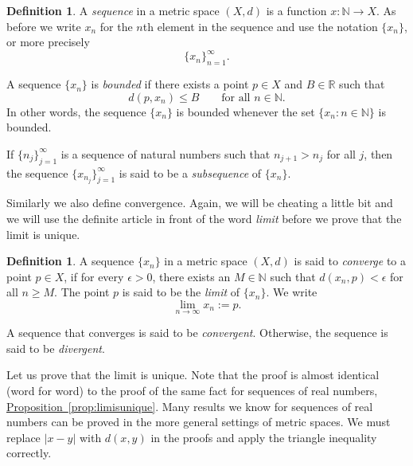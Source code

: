 \documentclass[12pt]{book}
\newcommand{\abs}[1]{\left\lvert {#1} \right\rvert}
\newcommand{\R}{{\mathbb{R}}}
\newcommand{\N}{{\mathbb{N}}}
\newcommand{\myindex}[1]{#1\index{#1}}
\theoremstyle{plain}
\theoremstyle{remark}
\theoremstyle{definition}
\newtheorem{defn}[thm]{Definition}
\theoremstyle{exercise}
\theoremstyle{example}
\newcommand{\propref}[1]{\hyperref[#1]{Proposition~\ref*{#1}}}
\begin{document}
\begin{defn}
A \emph{\myindex{sequence}} in a metric space $(X,d)$ is a function
$x \colon \N \to X$.  As before we write $x_n$ for the $n$th element in
the sequence and use the notation $\{ x_n \}$, or more precisely
\begin{equation*}
\{ x_n \}_{n=1}^\infty .
\end{equation*}

A sequence $\{ x_n \}$ is \emph{bounded} if
there exists a point $p \in X$ and $B \in \R$ such that
\begin{equation*}
d(p,x_n) \leq B \qquad \text{for all $n \in \N$.}
\end{equation*}
In other words, the sequence $\{x_n\}$ is bounded whenever
the set $\{ x_n : n \in \N \}$
is bounded.

If $\{ n_j \}_{j=1}^\infty$ is a sequence of natural numbers
such that $n_{j+1} > n_j$ for all $j$, then
the sequence $\{ x_{n_j} \}_{j=1}^\infty$ is said to be
a \emph{\myindex{subsequence}} of $\{x_n \}$.
\end{defn}

Similarly we also define convergence.  Again, we will be cheating a little
bit and we will use the definite article in front of the word \emph{limit}
before we prove that the limit is unique.

\begin{defn}
A sequence $\{ x_n \}$ in a metric space $(X,d)$ is said
to \emph{\myindex{converge}} to a point
$p \in X$, if for every $\epsilon > 0$, there exists an $M \in \N$ such
that $d(x_n,p) < \epsilon$ for all $n \geq M$.  The point $p$
is said to be the \emph{limit}
of $\{ x_n \}$.  We write
\begin{equation*}
\lim_{n\to \infty} x_n := p .
\end{equation*}

A sequence
that converges is said to be \emph{convergent}.
Otherwise, the sequence is said to be
\emph{divergent}.
\end{defn}

Let us prove that the limit is unique.  Note that the proof is almost
identical (word for word) to the proof of the same fact for sequences of
real numbers,
\propref{prop:limisunique}.
Many results we know for sequences of real numbers can be proved in
the more general settings of metric spaces.  We must replace $\abs{x-y}$
with $d(x,y)$ in the proofs and apply the triangle inequality correctly.
\end{document}
